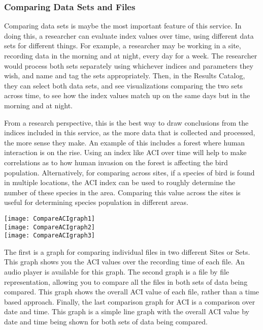 \subsubsection{Comparing Data Sets and Files}
Comparing data sets is maybe the most important feature of this service. In doing this, a researcher can evaluate index values over time, using different data sets for different things. For example, a researcher may be working in a site, recording data in the morning and at night, every day for a week. The researcher would process both sets separately using whichever indices and parameters they wish, and name and tag the sets appropriately. Then, in the Results Catalog, they can select both data sets, and see visualizations comparing the two sets across time, to see how the index values match up on the same days but in the morning and at night.\par
From a research perspective, this is the best way to draw conclusions from the indices included in this service, as the more data that is collected and processed, the more sense they make. An example of this includes a forest where human interaction is on the rise. Using an index like ACI over time will help to make correlations as to how human invasion on the forest is affecting the bird population. Alternatively, for comparing across sites, if a species of bird is found in multiple locations, the ACI index can be used to roughly determine the number of these species in the area. Comparing this value across the sites is useful for determining species population in different areas.\\

\begin{center}
	\texttt{[image: CompareACIgraph1]} \\[12pt]
	\texttt{[image: CompareACIgraph2]} \\[12pt]
	\texttt{[image: CompareACIgraph3]} \\[12pt]
\end{center}

The first is a graph for comparing individual files in two different Sites or Sets. This graph shows you the ACI values over the recording time of each file. An audio player is available for this graph. The second graph is a file by file representation, allowing you to compare all the files in both sets of data being compared. This graph shows the overall ACI value of each file, rather than a time based approach. Finally, the last comparison graph for ACI is a comparison over date and time. This graph is a simple line graph with the overall ACI value by date and time being shown for both sets of data being compared.\\

